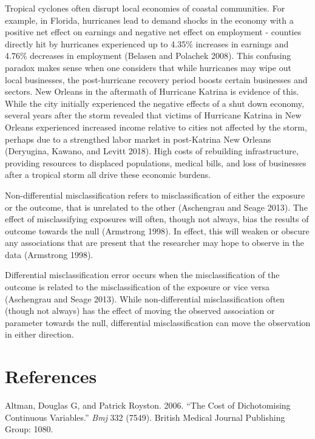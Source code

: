 \documentclass[]{article}
\begin{document}
Tropical cyclones often disrupt local economies of coastal communities.
For example, in Florida, hurricanes lead to demand shocks in the economy
with a positive net effect on earnings and negative net effect on
employment - counties directly hit by hurricanes experienced up to
4.35\% increases in earnings and 4.76\% decreases in employment (Belasen
and Polachek 2008). This confusing paradox makes sense when one
considers that while hurricanes may wipe out local businesses, the
post-hurricane recovery period boosts certain businesses and sectors.
New Orleans in the aftermath of Hurricane Katrina is evidence of this.
While the city initially experienced the negative effects of a shut down
economy, several years after the storm revealed that victims of
Hurricane Katrina in New Orleans experienced increased income relative
to cities not affected by the storm, perhaps due to a strengthed labor
market in post-Katrina New Orleans (Deryugina, Kawano, and Levitt 2018).
High costs of rebuilding infrastructure, providing resources to
displaced populations, medical bills, and loss of businesses after a
tropical storm all drive these economic burdens.

Non-differential misclassification refers to misclassification of either
the exposure or the outcome, that is unrelated to the other (Aschengrau
and Seage 2013). The effect of misclassifying exposures will often,
though not always, bias the results of outcome towards the null
(Armstrong 1998). In effect, this will weaken or obscure any
associations that are present that the researcher may hope to observe in
the data (Armstrong 1998).

Differential misclassification error occurs when the misclassification
of the outcome is related to the misclassification of the exposure or
vice versa (Aschengrau and Seage 2013). While non-differential
misclassification often (though not always) has the effect of moving the
observed association or parameter towards the null, differential
misclassification can move the observation in either direction.

\section*{References}\label{references}

\hypertarget{refs}{}
\hypertarget{ref-altman2006cost}{}
Altman, Douglas G, and Patrick Royston. 2006. ``The Cost of
Dichotomising Continuous Variables.'' \emph{Bmj} 332 (7549). British
Medical Journal Publishing Group: 1080.
\end{document}
